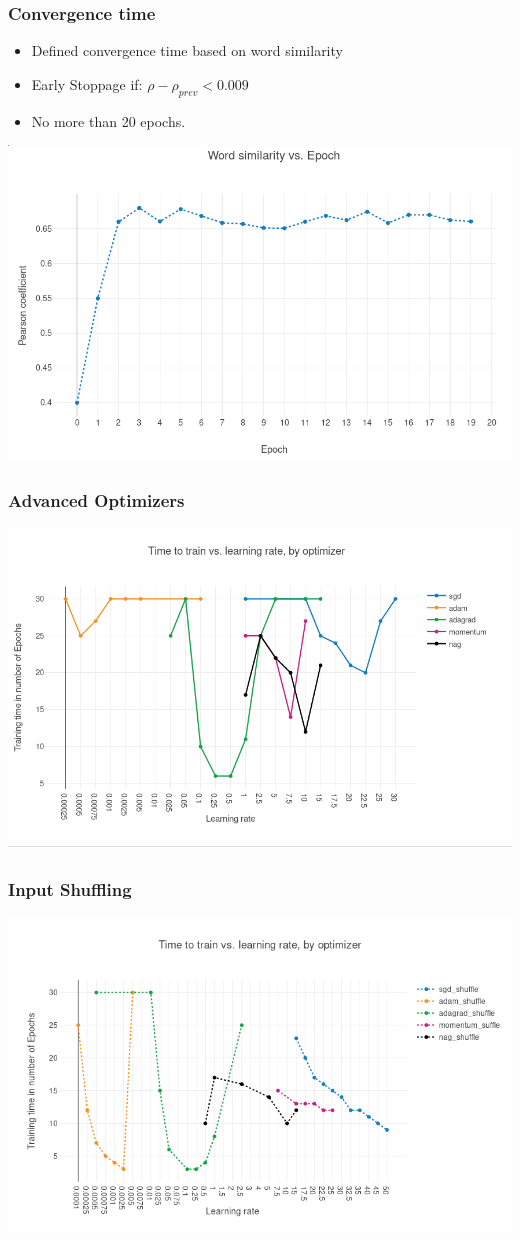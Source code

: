 \begin{frame}
\frametitle{Convergence time}
\begin{itemize}
\item Defined convergence time based on word similarity
\item Early Stoppage if: $ \rho -  \rho_{prev} < 0.009$ 
\item No more than 20 epochs. 
\end{itemize}
\includegraphics[scale=0.3]{images/wordsim_convergence}
\end{frame}
\begin{frame}
\frametitle{Advanced Optimizers}
\includegraphics[scale=0.4]{images/results_optim}
\end{frame}
\begin{frame}
\frametitle{Input Shuffling}
\includegraphics[scale=0.4]{images/results_shuffle}
\end{frame}